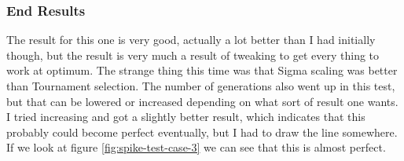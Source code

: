 \subsubsection{End Results}\label{sec:test-case-3-results}
The result for this one is very good, actually a lot better than I had initially
though, but the result is very much a result of tweaking to get every thing to
work at optimum. The strange thing this time was that Sigma scaling was better
than Tournament selection. The number of generations also went up in this test,
but that can be lowered or increased depending on what sort of result one wants.
I tried increasing and got a slightly better result, which indicates that this
probably could become perfect eventually, but I had to draw the line somewhere.
If we look at figure \ref{fig:spike-test-case-3} we can see that this is almost
perfect.

